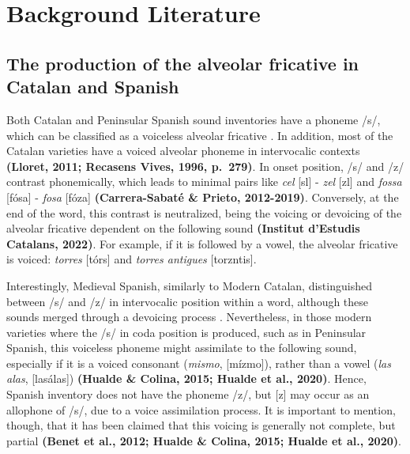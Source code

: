 \documentclass[
  a4paper,
  11pt,
  twocolumn]{article}
\begin{document}
\section{Background Literature}

\subsection{The production of the alveolar fricative in Catalan and Spanish}

Both Catalan and Peninsular Spanish sound inventories have a phoneme
/s/, which can be classified as a voiceless alveolar fricative
\cite{hualde_colina_2015}. In addition, most of the Catalan varieties
have a voiced alveolar phoneme in intervocalic contexts \textbf{(Lloret,
2011; Recasens Vives, 1996, p.~279)}. In onset position, /s/ and /z/
contrast phonemically, which leads to minimal pairs like \emph{cel}
{[}s\textepsilon l{]} - \emph{zel} {[}z\textepsilon l{]} and
\emph{fossa} {[}fósa{]} - \emph{fosa} {[}fóza{]} \textbf{(Carrera-Sabaté
\& Prieto, 2012-2019)}. Conversely, at the end of the word, this
contrast is neutralized, being the voicing or devoicing of the alveolar
fricative dependent on the following sound \textbf{(Institut d'Estudis
Catalans, 2022)}. For example, if it is followed by a vowel, the
alveolar fricative is voiced: \emph{torres} {[}tór\textschwa{}s{]} and
\emph{torres antigues}
{[}tor\textschwa{}z\textschwa{}nti\textgamma{}\textschwa{}s{]}.

Interestingly, Medieval Spanish, similarly to Modern Catalan,
distinguished between /s/ and /z/ in intervocalic position within a
word, although these sounds merged through a devoicing process
\cite{hualde_colina_2015}. Nevertheless, in those modern varieties where
the /s/ in coda position is produced, such as in Peninsular Spanish,
this voiceless phoneme might assimilate to the following sound,
especially if it is a voiced consonant (\emph{mismo}, {[}mízmo{]}),
rather than a vowel (\emph{las alas}, {[}lasálas{]}) \textbf{(Hualde \&
Colina, 2015; Hualde et al., 2020)}. Hence, Spanish inventory does not
have the phoneme /z/, but {[}z{]} may occur as an allophone of /s/, due
to a voice assimilation process. It is important to mention, though,
that it has been claimed that this voicing is generally not complete,
but partial \textbf{(Benet et al., 2012; Hualde \& Colina, 2015; Hualde
et al., 2020)}.
\end{document}
